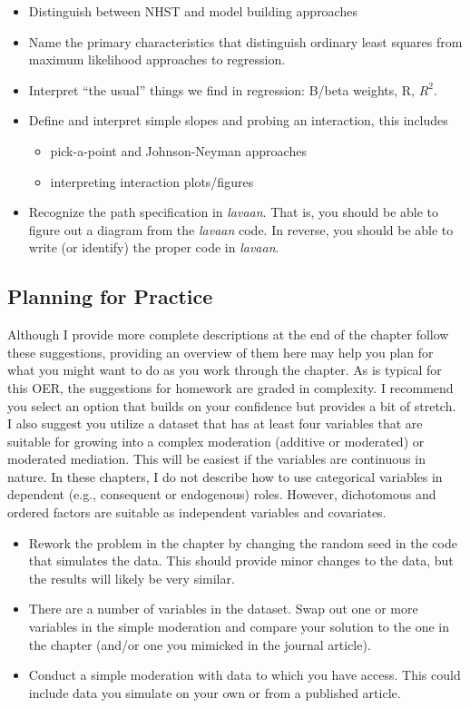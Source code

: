 \documentclass[
  11pt,
]{book}
\providecommand{\tightlist}{%
  \setlength{\itemsep}{0pt}\setlength{\parskip}{0pt}}
\begin{document}
\begin{itemize}
\tightlist
\item
  Distinguish between NHST and model building approaches
\item
  Name the primary characteristics that distinguish ordinary least squares from maximum likelihood approaches to regression.
\item
  Interpret ``the usual'' things we find in regression: B/beta weights, R, \(R^{2}\).
\item
  Define and interpret simple slopes and probing an interaction, this includes

  \begin{itemize}
  \tightlist
  \item
    pick-a-point and Johnson-Neyman approaches
  \item
    interpreting interaction plots/figures
  \end{itemize}
\item
  Recognize the path specification in \emph{lavaan}. That is, you should be able to figure out a diagram from the \emph{lavaan} code. In reverse, you should be able to write (or identify) the proper code in \emph{lavaan}.
\end{itemize}

\hypertarget{planning-for-practice-6}{%
\subsection{Planning for Practice}\label{planning-for-practice-6}}

Although I provide more complete descriptions at the end of the chapter follow these suggestions, providing an overview of them here may help you plan for what you might want to do as you work through the chapter. As is typical for this OER, the suggestions for homework are graded in complexity. I recommend you select an option that builds on your confidence but provides a bit of stretch. I also suggest you utilize a dataset that has at least four variables that are suitable for growing into a complex moderation (additive or moderated) or moderated mediation. This will be easiest if the variables are continuous in nature. In these chapters, I do not describe how to use categorical variables in dependent (e.g., consequent or endogenous) roles. However, dichotomous and ordered factors are suitable as independent variables and covariates.

\begin{itemize}
\tightlist
\item
  Rework the problem in the chapter by changing the random seed in the code that simulates the data. This should provide minor changes to the data, but the results will likely be very similar.
\item
  There are a number of variables in the dataset. Swap out one or more variables in the simple moderation and compare your solution to the one in the chapter (and/or one you mimicked in the journal article).
\item
  Conduct a simple moderation with data to which you have access. This could include data you simulate on your own or from a published article.
\end{itemize}
\end{document}
